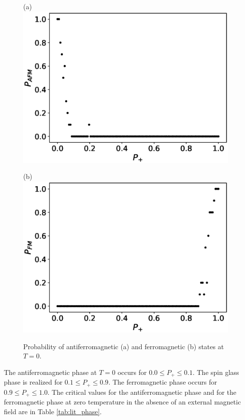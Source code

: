 \documentclass[preprint,12pt]{elsarticle}
\begin{document}
	\begin{figure}[H]
		\begin{minipage}[h]{0.45\linewidth}
			\centering (a)
			\includegraphics[width=1\linewidth]{images/P_AFM_Mmax.eps}
		\end{minipage}
		\hfill
		\begin{minipage}[h]{0.45\linewidth}
			\centering (b)
			\includegraphics[width=1\linewidth]{images/P_FM_Mmax.eps}
		\end{minipage}
		\caption{Probability of antiferromagnetic (a) and ferromagnetic (b) states at \( T = 0 \).}
		\label{fig:P_AFM_FM_Mmax}
	\end{figure}
	
	The antiferromagnetic phase at $T = 0$ occurs for $0.0 \leq P_+ \leq 0.1$. The spin glass phase is realized for $0.1 \leq P_+ \leq 0.9$. The ferromagnetic phase occurs for $0.9 \leq P_+ \leq 1.0$. The critical values for the antiferromagnetic phase and for the ferromagnetic phase at zero temperature in the absence of an external magnetic field are in Table \ref{tab:lit_phase}.
	
\end{document}
